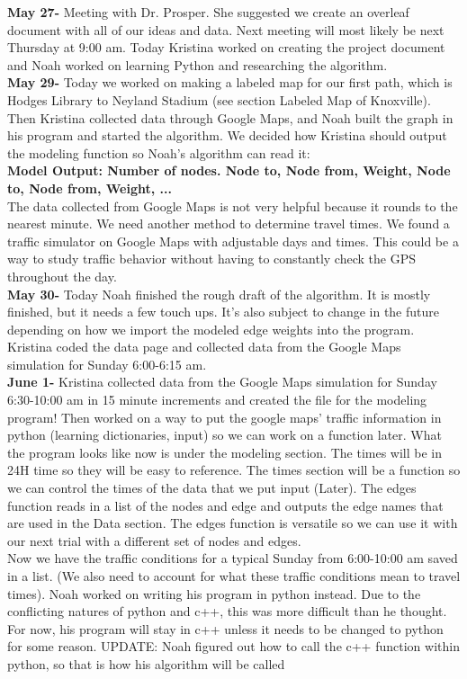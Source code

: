 \documentclass{article}
\begin{document}
\textbf{May 27-} Meeting with Dr. Prosper. She suggested we create an overleaf document with all of our ideas and data. Next meeting will most likely be next Thursday at 9:00 am. 
Today Kristina worked on creating the project document and Noah worked on learning Python and researching the algorithm. \\

\textbf{May 29-} Today we worked on making a labeled map for our first path, which is Hodges Library to Neyland Stadium (see section Labeled Map of Knoxville). Then Kristina collected data through Google Maps, and Noah built the graph in his program and started the algorithm. We decided how Kristina should output the modeling function so Noah's algorithm can read it: \\
\indent\textbf{Model Output: Number of nodes. Node to, Node from, Weight, Node to, Node from, Weight, ... }\\

The data collected from Google Maps is not very helpful because it rounds to the nearest minute. We need another method to determine travel times. We found a traffic simulator on Google Maps with adjustable days and times. This could be a way to study traffic behavior without having to constantly check the GPS throughout the day. \\

\textbf{May 30-} Today Noah finished the rough draft of the algorithm. It is mostly finished, but it needs a few touch ups. It's also subject to change in the future depending on how we import the modeled edge weights into the program. \\
Kristina coded the data page and collected data from the Google Maps simulation for Sunday 6:00-6:15 am. \\

\textbf{June 1-} Kristina collected data from the Google Maps simulation for Sunday 6:30-10:00 am in 15 minute increments and created the file for the modeling program! Then worked on a way to put the google maps' traffic information in python (learning dictionaries, input) so we can work on a function later. What the program looks like now is under the modeling section. The times will be in 24H time so they will be easy to reference. The times section will be a function so we can control the times of the data that we put input (Later). The edges function reads in a list of the nodes and edge and outputs the edge names that are used in the Data section. The edges function is versatile so we can use it with our next trial with a different set of nodes and edges. \\
Now we have the traffic conditions for a typical Sunday from 6:00-10:00 am saved in a list. (We also need to account for what these traffic conditions mean to travel times).
Noah worked on writing his program in python instead. Due to the conflicting natures of python and c++, this was more difficult than he thought. For now, his program will stay in c++ unless it needs to be changed to python for some reason. UPDATE: Noah figured out how to call the c++ function within python, so that is how his algorithm will be called \\
\end{document}
